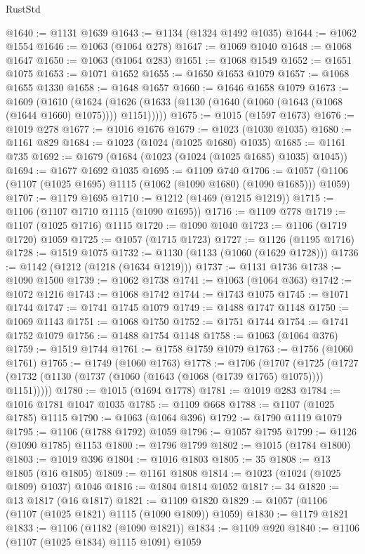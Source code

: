 \begin{lexlean}{RustStd}
\begin{coremodule}
@1640 := @1131 @1639
@1643 := @1134 (@1324 @1492 @1035)
@1644 := @1062 @1554
@1646 := @1063 (@1064 @278)
@1647 := @1069 @1040
@1648 := @1068 @1647
@1650 := @1063 (@1064 @283)
@1651 := @1068 @1549
@1652 := @1651 @1075
@1653 := @1071 @1652
@1655 := @1650 @1653 @1079
@1657 := @1068 @1655 @1330
@1658 := @1648 @1657
@1660 := @1646 @1658 @1079
@1673 := @1609
    (@1610
      (@1624 (@1626 (@1633 (@1130 (@1640 (@1060 (@1643 (@1068 (@1644 @1660) @1075)))) @1151)))))
@1675 := @1015 (@1597 @1673)
@1676 := @1019 @278
@1677 := @1016 @1676
@1679 := @1023 (@1030 @1035)
@1680 := @1161 @829
@1684 := @1023 (@1024 (@1025 @1680) @1035)
@1685 := @1161 @735
@1692 := @1679 (@1684 (@1023 (@1024 (@1025 @1685) @1035) @1045))
@1694 := @1677 @1692 @1035
@1695 := @1109 @740
@1706 := @1057 (@1106 (@1107 (@1025 @1695) @1115 (@1062 (@1090 @1680) (@1090 @1685))) @1059)
@1707 := @1179 @1695
@1710 := @1212 (@1469 (@1215 @1219))
@1715 := @1106 (@1107 @1710 @1115 (@1090 @1695))
@1716 := @1109 @778
@1719 := @1107 (@1025 @1716) @1115
@1720 := @1090 @1040
@1723 := @1106 (@1719 @1720) @1059
@1725 := @1057 (@1715 @1723)
@1727 := @1126 (@1195 @1716)
@1728 := @1519 @1075
@1732 := @1130 (@1133 (@1060 (@1629 @1728)))
@1736 := @1142 (@1212 (@1218 (@1634 @1219)))
@1737 := @1131 @1736
@1738 := @1090 @1500
@1739 := @1062 @1738
@1741 := @1063 (@1064 @363)
@1742 := @1072 @1216
@1743 := @1068 @1742
@1744 := @1743 @1075
@1745 := @1071 @1744
@1747 := @1741 @1745 @1079
@1749 := @1488 @1747 @1148
@1750 := @1069 @1143
@1751 := @1068 @1750
@1752 := @1751 @1744
@1754 := @1741 @1752 @1079
@1756 := @1488 @1754 @1148
@1758 := @1063 (@1064 @376)
@1759 := @1519 @1744
@1761 := @1758 @1759 @1079
@1763 := @1756 (@1060 @1761)
@1765 := @1749 (@1060 @1763)
@1778 := @1706
    (@1707
      (@1725 (@1727 (@1732 (@1130 (@1737 (@1060 (@1643 (@1068 (@1739 @1765) @1075)))) @1151)))))
@1780 := @1015 (@1694 @1778)
@1781 := @1019 @283
@1784 := @1016 @1781 @1047 @1035
@1785 := @1109 @668
@1788 := @1107 (@1025 @1785) @1115
@1790 := @1063 (@1064 @396)
@1792 := @1790 @1119 @1079
@1795 := @1106 (@1788 @1792) @1059
@1796 := @1057 @1795
@1799 := @1126 (@1090 @1785) @1153
@1800 := @1796 @1799
@1802 := @1015 (@1784 @1800)
@1803 := @1019 @396
@1804 := @1016 @1803
@1805 := 35
@1808 := @13 @1805 (@16 @1805)
@1809 := @1161 @1808
@1814 := @1023 (@1024 (@1025 @1809) @1037) @1046
@1816 := @1804 @1814 @1052
@1817 := 34
@1820 := @13 @1817 (@16 @1817)
@1821 := @1109 @1820
@1829 := @1057 (@1106 (@1107 (@1025 @1821) @1115 (@1090 @1809)) @1059)
@1830 := @1179 @1821
@1833 := @1106 (@1182 (@1090 @1821))
@1834 := @1109 @920
@1840 := @1106 (@1107 (@1025 @1834) @1115 @1091) @1059

\end{coremodule}
\end{lexlean}
